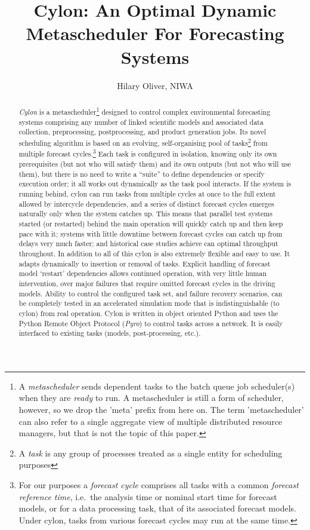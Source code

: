 \documentclass[11pt,a4paper]{article}
\title{Cylon: An Optimal Dynamic Metascheduler For Forecasting Systems}
\author{Hilary Oliver, NIWA}
\begin{document}
\maketitle

\pagebreak
\tableofcontents
\pagebreak

\begin{abstract}

    {\em Cylon} is a metascheduler\footnote{A {\em metascheduler} sends
    dependent tasks to the batch queue job scheduler(s) when they are
    {\em ready} to run. A metascheduler is still a form of scheduler,
    however, so we drop the 'meta' prefix from here on. The term
    'metascheduler' can also refer to a single aggregate view of
    multiple distributed resource managers, but that is not the topic of
    this paper.} designed to control complex environmental forecasting
    systems comprising any number of linked scientific models and
    associated data collection, preprocessing, postprocessing, and
    product generation jobs. Its novel scheduling algorithm is based on
    an evolving, self-organising pool of tasks\footnote{A {\em task} is
    any group of processes treated as a single entity for scheduling
    purposes} from multiple forecast cycles.\footnote{For our purposes a
    {\em forecast cycle} comprises all tasks with a common {\em forecast
    reference time}, i.e.\ the analysis time or nominal start time for
    forecast models, or for a data processing task, that of its
    associated forecast models. Under cylon, tasks from various forecast
    cycles may run at the same time.} Each task is configured in
    isolation, knowing only its own prerequisites (but not who will
    satisfy them) and its own outputs (but not who will use them), but
    there is no need to write a ``suite'' to define dependencies or
    specify execution order; it all works out dynamically as the task
    pool interacts. If the system is running behind, cylon can run tasks
    from multiple cycles at once to the full extent allowed by
    intercycle dependencies, and a series of distinct forecast cycles
    emerges naturally only when the system catches up. This means that
    parallel test systems started (or restarted) behind the main
    operation will quickly catch up and then keep pace with it; systems
    with little downtime between forecast cycles can catch up from
    delays very much faster; and historical case studies achieve can
    optimal throughput throughout.  In addition to all of this cylon is
    also extremely flexible and easy to use. It adapts dynamically to
    insertion or removal of tasks.  Explicit handling of forecast model
    `restart' dependencies allows continued operation, with very little
    human intervention, over major failures that require omitted
    forecast cycles in the driving models.  Ability to control the
    configured task set, and failure recovery scenarios, can be
    completely tested in an accelerated simulation mode that is
    indistinguishable (to cylon) from real operation. Cylon is written
    in object oriented Python and uses the Python Remote Object Protocol
    ({\em Pyro}) to control tasks across a network. It is easily
    interfaced to existing tasks (models, post-processing, etc.).


\end{abstract}
\end{document}
